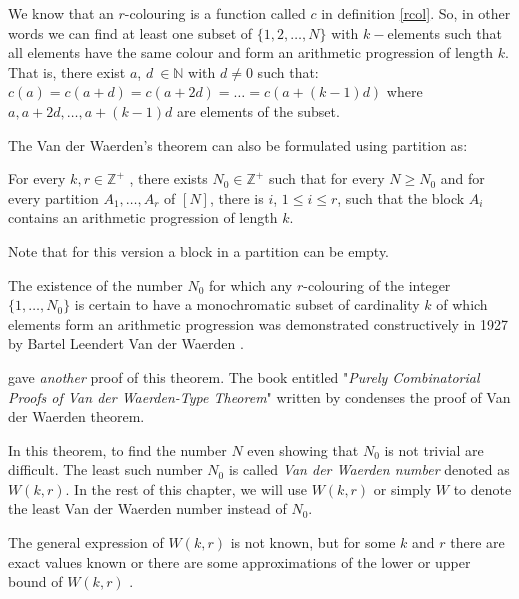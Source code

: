 
We know that an $r$-colouring is a function called $c$ in definition \eqref{rcol}. So, in other words we can find at least one subset of $\{1,2,\ldots,N\}$ with $k-$elements such that all elements have the same colour and form an arithmetic progression of length $k$. That is, there exist
$a$,  $d \ \in \mathbb{N}$ with $d\neq 0$ such that: $c(a)=c(a+d)=c(a+2d)=\ldots =c(a+(k-1)d)$ where $a, a+2d, \ldots, a+(k-1)d$ are elements of the subset.

The Van der Waerden's theorem can also be formulated using partition \citep{dransfield2004} as:

\begin{thm}
For every $k, r \in \mathbb{Z}^+$ , there exists $N_0 \in \mathbb{Z}^+$ such that for every $N \geq N_0$ and for every partition $A_1, \ldots , A_r$ of $[N]$, there is $i$, $1 \leq i \leq r$, such that the block $A_i$ contains an arithmetic progression of  length $k.$   \label{vd2}
\end{thm}

Note that for this version a block in a partition can be empty. 

The existence of the number $N_0$ for which any $r$-colouring of the integer $\{1, \ldots, N_0 \}$ is certain to have a monochromatic subset of cardinality $k$ of which elements form an arithmetic progression was demonstrated constructively in 1927 by Bartel Leendert Van der Waerden  \citep{van1927beweis}.

\cite{graham1974short} gave \emph{another} proof of this theorem. The book entitled "\textit{Purely Combinatorial Proofs of Van der Waerden-Type Theorem}" written by \cite{gasarch2010purely} condenses  the proof of Van der Waerden theorem.

In this theorem, to find the number $N$ even showing that $N_0$ is not trivial are difficult. The least such number $N_0$ is called \textit{Van der Waerden number} denoted as $W(k,r).$ In the rest of this chapter, we will use $W(k,r)$ or simply $W$ to denote the least Van der Waerden number instead of $N_0.$

The general expression of $W(k,r)$ is not known, but for some $k$ and $r$ there are exact values known or there are some approximations of the  lower or upper bound of $W(k,r)$  \citep{dransfield2004}.

